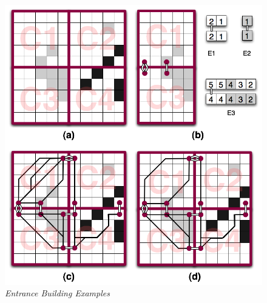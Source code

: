 \begin{figure}[htbp]
        \caption{\emph{Entrance Building Examples} }
        \begin{center}
                        \includegraphics[scale=0.25]{diagrams/clusters_and_entrances.png}
        \end{center}
        \label{aha-fig:abstractgraph}
\end{figure}
